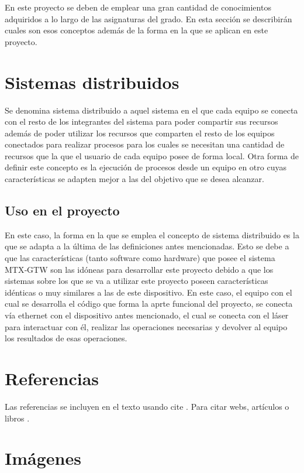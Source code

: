 
En este proyecto se deben de emplear una gran cantidad de  conocimientos adquiridos a lo largo de las asignaturas del grado. En esta sección se describirán cuales son esos conceptos además de la forma en la que se aplican en este proyecto.

\section{Sistemas distribuidos}

Se denomina sistema distribuido a aquel sistema en el que cada equipo se conecta con el resto de los integrantes del sistema para poder compartir sus recursos además de poder utilizar los recursos que comparten el resto de los equipos conectados para realizar procesos para los cuales se necesitan una cantidad de recursos que la que el usuario de cada equipo posee de forma local. Otra forma de definir este concepto es la ejecución de procesos desde un equipo en otro cuyas características se adapten mejor a las del objetivo que se desea alcanzar.

\subsection{Uso en el proyecto}

En este caso, la forma en la que se emplea el concepto de sistema distribuido es la que se adapta a la última de las definiciones antes mencionadas. Esto se debe a que las características (tanto software como hardware) que posee el sistema MTX‐GTW son las idóneas para desarrollar este proyecto debido a que los sistemas sobre los que se va a utilizar este proyecto poseen características idénticas o muy similares a las de este dispositivo. En este caso, el equipo con el cual se desarrolla el código que forma la aprte funcional del proyecto, se conecta vía ethernet con el dispositivo antes mencionado, el cual se conecta con el láser para interactuar con él, realizar las operaciones necesarias y devolver al equipo los resultados de esas operaciones.


\section{Referencias}

Las referencias se incluyen en el texto usando cite \cite{wiki:latex}. Para citar webs, artículos o libros \cite{koza92}.


\section{Imágenes}

